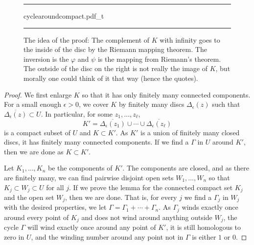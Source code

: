 \documentclass[12pt,openany]{book}
\theoremstyle{plain}
\theoremstyle{remark}
\theoremstyle{definition}
\newenvironment{myfig}{%
\begin{figure}[h!t]
\noindent\rule{\textwidth}{0.5pt}\vspace{12pt}\par\centering}%
{\par\noindent\rule{\textwidth}{0.5pt}
\end{figure}}
\theoremstyle{exercise}
\theoremstyle{example}
\begin{document}
\begin{myfig}
{cyclearoundcompact.pdf_t}
\caption{The idea of the proof: The complement of $K$ with infinity goes to
the inside of the disc by the Riemann mapping theorem.  The inversion is the
$\varphi$ and $\psi$ is the mapping from Riemann's theorem.
The outside of the disc on the right is not really the image of $K$, but
morally one could think of it that way (hence the quotes).\label{fig:cyclearoundcompact}}
\end{myfig}

\begin{proof}
We first enlarge $K$ so that it
has only finitely many connected components.  For a small enough $\epsilon > 0$, we cover
$K$ by finitely many discs $\Delta_\epsilon(z)$ such that $\overline{\Delta_{\epsilon}(z)}
\subset U$.  In particular, for some $z_1,\ldots,z_\ell$,
\begin{equation*}
K' =
\overline{\Delta_{\epsilon}(z_1)}
\cup \cdots \cup
\overline{\Delta_{\epsilon}(z_\ell)}
\end{equation*}
is a compact subset of $U$ and $K \subset K'$.
As $K'$ is a union of finitely many closed discs, it has
finitely many connected components.
If we find a $\Gamma$ in $U$ around $K'$, then we are done as $K \subset K'$.

Let $K_1,\ldots,K_n$ be the components of $K'$.
The components are closed, and as there are finitely many,
we can find pairwise disjoint open sets $W_1,\ldots,W_n$
so that $K_j \subset W_j \subset U$ for all $j$.
If we prove the lemma for the connected compact set $K_j$ and
the open set $W_j$, then we are done.
That is, for every $j$ we find a $\Gamma_j$ in $W_j$
with the desired properties, we let $\Gamma = \Gamma_1 + \cdots +
\Gamma_n$.  As $\Gamma_j$ winds exactly once around every point of $K_j$
and does not wind around anything outside $W_j$, the cycle
$\Gamma$ will wind exactly once around any point of $K'$,
it is still homologous to zero in $U$, and the winding number
around any point not in $\Gamma$ is either $1$ or $0$.


\end{proof}
\end{document}
